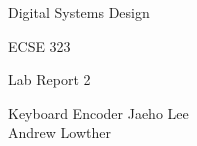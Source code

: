 \documentclass[12pt,letterpaper,titlepage]{article}
\begin{document}
\begin{titlepage}
	\centering
	{\LARGE Digital Systems Design \par}
	{\LARGE ECSE 323 \par}
	\vspace{.5cm}
	{\LARGE Lab Report 2 \par}
	{\LARGE Keyboard Encoder}
	\vfill
	Jaeho Lee \\
	Andrew Lowther \\
\end{titlepage}




\end{document}
